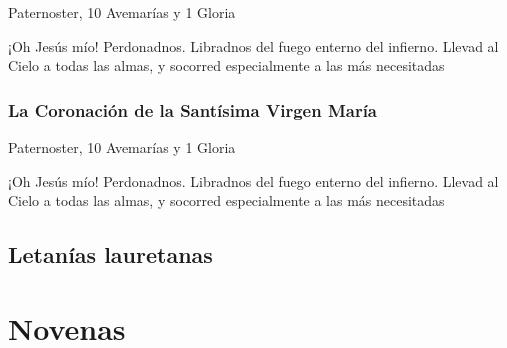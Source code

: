 \documentclass[a4paper,11pt, oneside]{report}
\begin{document}
        \smallskip
         Paternoster, 10 Avemarías y 1 Gloria
        
        \smallskip
        ¡Oh Jesús mío! Perdonadnos. Libradnos del fuego enterno del infierno. Llevad al Cielo a todas las almas, y socorred especialmente a las más 
        necesitadas

      \subsection{La Coronación de la Santísima Virgen María}
        
        \smallskip
         Paternoster, 10 Avemarías y 1 Gloria
        
        \smallskip
        ¡Oh Jesús mío! Perdonadnos. Libradnos del fuego enterno del infierno. Llevad al Cielo a todas las almas, y socorred especialmente a las más 
        necesitadas

    \section{Letanías lauretanas}

  \chapter{Novenas}

  \printbibliography{}
\end{document}
